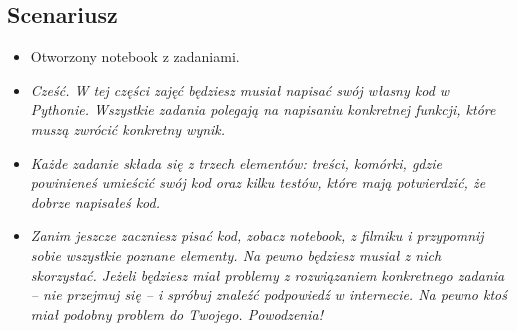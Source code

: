 \documentclass{mwart}
\begin{document}
\subsection{Scenariusz}
\begin{itemize}
  \item Otworzony notebook z zadaniami.
  \item \emph{Cześć. W tej części zajęć będziesz musiał napisać swój własny kod w
      Pythonie. Wszystkie zadania polegają na napisaniu konkretnej funkcji, które
      muszą zwrócić konkretny wynik.}
  \item \emph{Każde zadanie składa się z trzech elementów: treści, komórki, gdzie
      powinieneś umieścić swój kod oraz kilku testów, które mają potwierdzić, że dobrze
      napisałeś kod.}
  \item \emph{Zanim jeszcze zaczniesz pisać kod, zobacz notebook, z filmiku i przypomnij
      sobie wszystkie poznane elementy. Na pewno będziesz musiał z nich skorzystać.
      Jeżeli będziesz miał problemy z rozwiązaniem konkretnego zadania -- nie przejmuj
      się -- i spróbuj znaleźć podpowiedź w internecie. Na pewno ktoś miał podobny
      problem do Twojego. Powodzenia!}
\end{itemize}
\end{document}
